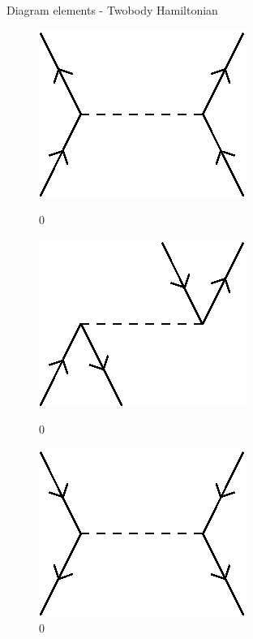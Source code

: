 \begin{frame}{Diagram elements - Twobody Hamiltonian}
    \begin{figure}
    \centering
    \parbox{0.30\textwidth}{
            \centering
            \includegraphics[scale=0.45]{graphics/v4}
            \caption{0}
        }\quad
        \parbox{0.30\textwidth}{
            \centering
            \includegraphics[scale=0.45]{graphics/v5}
            \caption{0}
        }\quad
        \parbox{0.30\textwidth}{
            \centering
            \includegraphics[scale=0.45]{graphics/v6}
            \caption{0}
        }
    \end{figure}


\end{frame}
